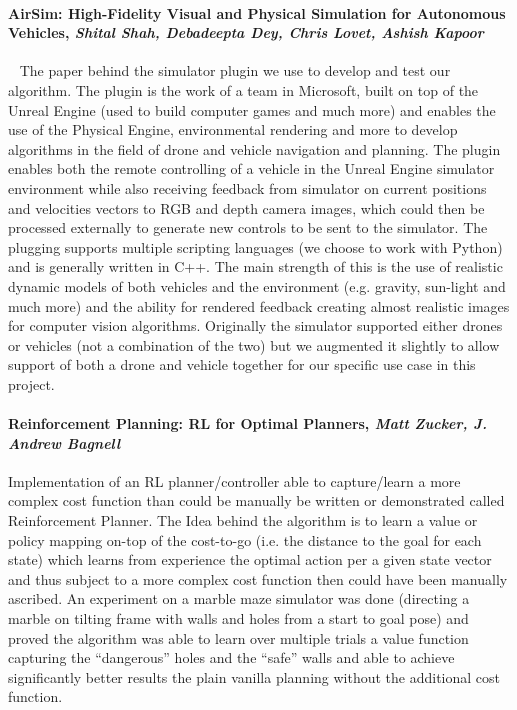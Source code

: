 \documentclass[a4paper,11pt]{article}
\begin{document}
\paragraph{AirSim: High-Fidelity Visual and Physical Simulation for Autonomous Vehicles, \textit{Shital Shah, Debadeepta Dey, Chris Lovet, Ashish Kapoor}} ~\cite{shah2018airsim}
The paper behind the simulator plugin we use to develop and test our algorithm. The plugin is the work of a team in Microsoft, built on top of the Unreal Engine (used to build computer games and much more) and enables the use of the Physical Engine, environmental rendering and more to develop algorithms in the field of drone and vehicle navigation and planning. The plugin enables both the remote controlling of a vehicle in the Unreal Engine simulator environment while also receiving feedback from simulator on current positions and velocities vectors to RGB and depth camera images, which could then be processed externally to generate new controls to be sent to the simulator. The plugging supports multiple scripting languages (we choose to work with Python) and is generally written in C++. The main strength of this is the use of realistic dynamic models of both vehicles and the environment (e.g. gravity, sun-light and much more) and the ability for rendered feedback creating almost realistic images for computer vision algorithms. Originally the simulator supported either drones or vehicles (not a combination of the two) but we augmented it slightly to allow support of both a drone and vehicle together for our specific use case in this project.

\paragraph{Reinforcement Planning: RL for Optimal Planners, \textit{Matt Zucker, J. Andrew Bagnell}} \cite{zucker2012reinforcement}
Implementation of an RL planner/controller able to capture/learn a more complex cost function than could be manually be written or demonstrated called Reinforcement Planner. The Idea behind the algorithm is to learn a value or policy mapping on-top of the cost-to-go (i.e. the distance to the goal for each state) which learns from experience the optimal action per a given state vector and thus subject to a more complex cost function then could have been manually ascribed. An experiment on a marble maze simulator was done (directing a marble on tilting frame with walls and holes from a start to goal pose) and proved the algorithm was able to learn over multiple trials a value function capturing the “dangerous” holes and the “safe” walls and able to achieve significantly better results the plain vanilla planning without the additional cost function.
\end{document}
